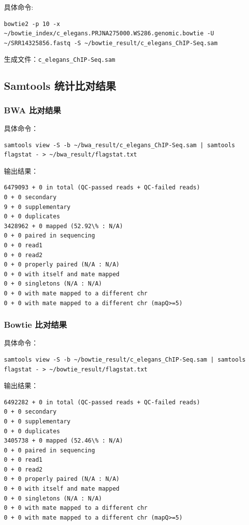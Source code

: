 \documentclass[UTF8]{ctexart}
\begin{document}
具体命令:

\begin{lstlisting}
bowtie2 -p 10 -x ~/bowtie_index/c_elegans.PRJNA275000.WS286.genomic.bowtie -U ~/SRR14325856.fastq -S ~/bowtie_result/c_elegans_ChIP-Seq.sam
\end{lstlisting}

生成文件：\verb|c_elegans_ChIP-Seq.sam|

\subsection{Samtools 统计比对结果}

\subsubsection{BWA 比对结果}

具体命令：

\begin{lstlisting}
samtools view -S -b ~/bwa_result/c_elegans_ChIP-Seq.sam | samtools flagstat - > ~/bwa_result/flagstat.txt
\end{lstlisting}

输出结果：

\begin{lstlisting}
6479093 + 0 in total (QC-passed reads + QC-failed reads)
0 + 0 secondary
9 + 0 supplementary
0 + 0 duplicates
3428962 + 0 mapped (52.92\% : N/A)
0 + 0 paired in sequencing
0 + 0 read1
0 + 0 read2
0 + 0 properly paired (N/A : N/A)
0 + 0 with itself and mate mapped
0 + 0 singletons (N/A : N/A)
0 + 0 with mate mapped to a different chr
0 + 0 with mate mapped to a different chr (mapQ>=5)
\end{lstlisting}

\subsubsection{Bowtie 比对结果}

具体命令：

\begin{lstlisting}
samtools view -S -b ~/bowtie_result/c_elegans_ChIP-Seq.sam | samtools flagstat - > ~/bowtie_result/flagstat.txt
\end{lstlisting}

输出结果：

\begin{lstlisting}
6492282 + 0 in total (QC-passed reads + QC-failed reads)
0 + 0 secondary
0 + 0 supplementary
0 + 0 duplicates
3405738 + 0 mapped (52.46\% : N/A)
0 + 0 paired in sequencing
0 + 0 read1
0 + 0 read2
0 + 0 properly paired (N/A : N/A)
0 + 0 with itself and mate mapped
0 + 0 singletons (N/A : N/A)
0 + 0 with mate mapped to a different chr
0 + 0 with mate mapped to a different chr (mapQ>=5)
\end{lstlisting}
\end{document}
